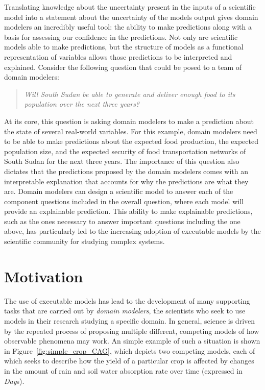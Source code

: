 Translating knowledge about the uncertainty present in the inputs of a scientific model into a statement about the uncertainty of the models output gives domain modelers an incredibly useful tool: the ability to make predictions along with a basis for assessing our confidence in the predictions.
Not only are scientific models able to make predictions, but the structure of models as a functional representation of variables allows those predictions to be interpreted and explained.
Consider the following question that could be posed to a team of domain modelers:
\begin{quote}
\textit{Will South Sudan be able to generate and deliver enough food to its population over the next three years?}
\end{quote}
At its core, this question is asking domain modelers to make a prediction about the state of several real-world variables.
For this example, domain modelers need to be able to make predictions about the expected food production, the expected population size, and the expected security of food transportation networks of South Sudan for the next three years.
The importance of this question also dictates that the predictions proposed by the domain modelers comes with an interpretable explanation that accounts for why the predictions are what they are.
Domain modelers can design a scientific model to answer each of the component questions included in the overall question, where each model will provide an explainable prediction.
This ability to make explainable predictions, such as the ones necessary to answer important questions including the one above, has particularly led to the increasing adoption of executable models by the scientific community for studying complex systems.

\section{Motivation\label{sec:motivation}}
The use of %
executable models has lead to the development of many supporting tasks that are carried out by \emph{domain modelers}, the scientists who seek to use models in their research studying a specific domain.
In general, science is driven by the repeated process of proposing multiple different, competing models of how observable phenomena may work.
An simple example of such a situation is shown in Figure~\ref{fig:simple_crop_CAG}, which depicts two competing models, each of which seeks to describe how the yield of a particular crop is affected by changes in the amount of rain and soil water absorption rate over time (expressed in \emph{Day}s).

